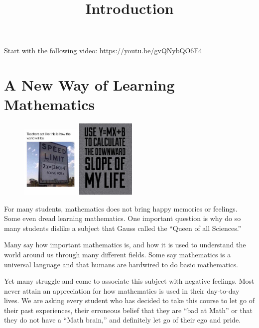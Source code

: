 \documentclass{article}
\title{Introduction}
\begin{document}
\begin{notes}
  Start with the following video: \url{https://youtu.be/gvQNybQO6E4}
\end{notes}

\section*{A New Way of Learning Mathematics}

\begin{figure}
  \includegraphics[width=0.25\textwidth]{speedlimit.png}

  \includegraphics[width=0.25\textwidth]{downwardslope.png}
\end{figure} 

For many students, mathematics does not bring happy memories or feelings. Some even dread learning mathematics. One important question is why do so many students dislike a subject that Gauss called the “Queen of all Sciences.” 

Many say how important mathematics is, and how it is used to understand the world around us through many different fields. Some say mathematics is a universal language and that humans are hardwired to do basic mathematics.


Yet many struggle and come to associate this subject with negative feelings. Most never attain an appreciation for how mathematics is used in their day-to-day lives.  We are asking every student who has decided to take this course to let go of their past experiences, their erroneous belief that they are “bad at Math” or that they do not have a “Math brain,” and definitely let go of their ego and pride. 
\end{document}
